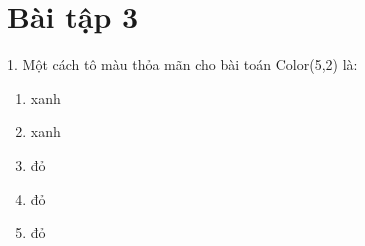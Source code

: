 \documentclass{article}
\begin{document}



\section*{Bài tập 3}
1. Một cách tô màu thỏa mãn cho bài toán Color(5,2) là:
\begin{enumerate}
     \item xanh
     \item xanh
     \item đỏ
     \item đỏ
     \item đỏ
\end{enumerate}
\end{document}
